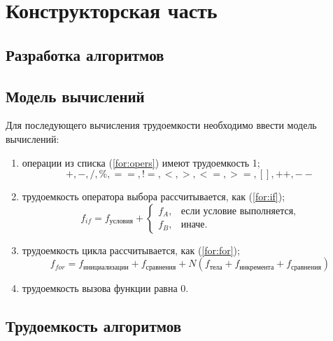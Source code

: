 \chapter{Конструкторская часть}

\section{Разработка алгоритмов}

{}


\clearpage
{}

\section{Модель вычислений}

Для последующего вычисления трудоемкости необходимо ввести модель вычислений:
\begin{enumerate}
    \item операции из списка (\ref{for:opers}) имеют трудоемкость 1;
        \begin{equation}
            \label{for:opers}
            +, -, /, \%, ==, !=, <, >, <=, >=, [], ++, {-}-
        \end{equation}
    \item трудоемкость оператора выбора  рассчитывается, как (\ref{for:if});
	\begin{equation}
        \label{for:if}
        f_{if} = f_{\text{условия}} +
        \begin{cases}
        f_A, & \text{если условие выполняется,}\\
        f_B, & \text{иначе.}
        \end{cases}
	\end{equation}
\item трудоемкость цикла рассчитывается, как (\ref{for:for});
    \begin{equation}
        \label{for:for}
        f_{for} = f_{\text{инициализации}} + f_{\text{сравнения}} + N(f_{\text{тела}} + f_{\text{инкремента}} + f_{\text{сравнения}})
    \end{equation}
	\item трудоемкость вызова функции равна 0.
\end{enumerate}

\section{Трудоемкость алгоритмов}

